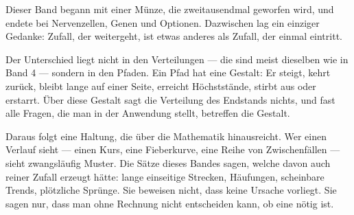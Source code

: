 \begin{merksatz}
\begin{center}
\begin{minipage}{0.9\textwidth}
Dieser Band begann mit einer Münze, die zweitausendmal geworfen wird, und endete bei Nervenzellen, Genen und Optionen. Dazwischen lag ein einziger Gedanke: Zufall, der weitergeht, ist etwas anderes als Zufall, der einmal eintritt.

Der Unterschied liegt nicht in den Verteilungen --- die sind meist dieselben wie in Band 4 --- sondern in den Pfaden. Ein Pfad hat eine Gestalt: Er steigt, kehrt zurück, bleibt lange auf einer Seite, erreicht Höchststände, stirbt aus oder erstarrt. Über diese Gestalt sagt die Verteilung des Endstands nichts, und fast alle Fragen, die man in der Anwendung stellt, betreffen die Gestalt.

Daraus folgt eine Haltung, die über die Mathematik hinausreicht. Wer einen Verlauf sieht --- einen Kurs, eine Fieberkurve, eine Reihe von Zwischenfällen --- sieht zwangsläufig Muster. Die Sätze dieses Bandes sagen, welche davon auch reiner Zufall erzeugt hätte: lange einseitige Strecken, Häufungen, scheinbare Trends, plötzliche Sprünge. Sie beweisen nicht, dass keine Ursache vorliegt. Sie sagen nur, dass man ohne Rechnung nicht entscheiden kann, ob eine nötig ist.
\end{minipage}
\end{center}

\begin{center}
\begin{minipage}{0.88\textwidth}
\end{minipage}
\end{center}
\end{merksatz}
